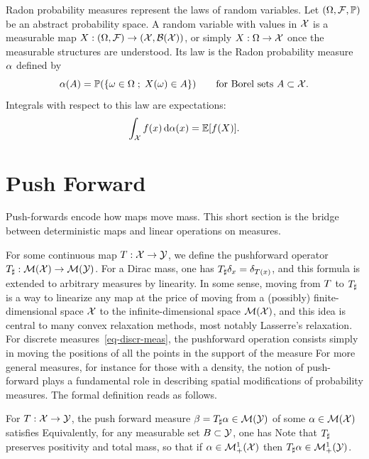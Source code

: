 Radon probability measures represent the laws of random variables. Let $(\Omega,\mathcal{F},\mathbb{P})$ be an abstract probability space. A random variable with values in $\mathcal{X}$ is a measurable map $X:(\Omega,\mathcal{F})\to(\mathcal{X},\mathcal{B}(\mathcal{X}))$, or simply $X:\Omega\to\mathcal{X}$ once the measurable structures are understood. Its law is the Radon probability measure $\alpha$ defined by
\[
	\al(A)=\PP(\enscond{\omega\in\Omega}{X(\omega)\in A})
	\qquad\text{for Borel sets } A\subset \X .
\index{Borel set}%
\]
Integrals with respect to this law are expectations:
\[
	\int_{\mathcal{X}} f(x)\,\mathrm{d}\alpha(x)=\mathbb{E}[f(X)].
\]


\section{Push Forward}
\label{sec-push-forward}


Push-forwards encode how maps move mass. This short section is the bridge between deterministic maps and linear operations on measures.

For some continuous map $T : \mathcal{X} \rightarrow \mathcal{Y}$, we define the pushforward operator $T_\sharp : \mathcal{M}(\mathcal{X}) \rightarrow \mathcal{M}(\mathcal{Y})$.
%
For a Dirac mass, one has $T_\sharp \delta_{x} = \delta_{T(x)}$, and this formula is extended to arbitrary measures by linearity. In some sense, moving from $T$ to $T_\sharp$ is a way to linearize any map at the price of moving from a (possibly) finite-dimensional space $\mathcal{X}$ to the infinite-dimensional space $\mathcal{M}(\mathcal{X})$, and this idea is central to many convex relaxation methods, most notably Lasserre's relaxation.
%
For discrete measures~\eqref{eq-discr-meas}, the pushforward operation consists simply in moving the positions of all the points in the support of the measure
For more general measures, for instance for those with a density, the notion of push-forward plays a fundamental role in describing spatial modifications of probability measures. The formal definition reads as follows.

\begin{defn}\label{defn-pushfwd}
For $T : \mathcal{X} \rightarrow \mathcal{Y}$, the push forward measure $\beta = T_\sharp \alpha \in \mathcal{M}(\mathcal{Y})$ of some $\alpha \in \mathcal{M}(\mathcal{X})$ satisfies
Equivalently, for any measurable set $B \subset \mathcal{Y}$, one has
Note that $T_\sharp$ preserves positivity and total mass, so that if $\alpha \in \mathcal{M}_+^1(\mathcal{X})$ then $T_\sharp \alpha \in \mathcal{M}_+^1(\mathcal{Y})$.
\end{defn}


